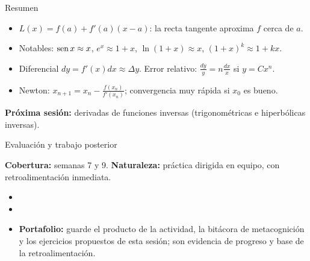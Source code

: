 \documentclass[10pt,aspectratio=169]{beamer}
\begin{document}
\begin{frame}{Resumen}
  \begin{itemize}
    \item $L(x)=f(a)+f'(a)(x-a)$: la recta tangente aproxima $f$ cerca de $a$.
    \item Notables: $\operatorname{sen} x\approx x$, $e^x\approx1+x$, $\ln(1+x)\approx x$, $(1+x)^k\approx1+kx$.
    \item Diferencial $dy=f'(x)dx\approx\Delta y$. Error relativo: $\frac{dy}{y}=n\frac{dx}{x}$ si $y=Cx^n$.
    \item Newton: $x_{n+1}=x_n-\frac{f(x_n)}{f'(x_n)}$; convergencia muy rápida si $x_0$ es bueno.
  \end{itemize}
  \vspace{3mm}
  \textbf{Próxima sesión:} derivadas de funciones inversas (trigonométricas e hiperbólicas inversas).
\end{frame}


\begin{frame}{Evaluación y trabajo posterior}
  \small
  \begin{evalbox}
    \textbf{Cobertura:} semanas 7 y 9. \textbf{Naturaleza:} práctica dirigida en equipo, con retroalimentación inmediata.
  \end{evalbox}
  \begin{itemize}
    \item \criterios
    \item \declaracionia
    \item \textbf{Portafolio:} guarde el producto de la actividad, la bitácora de metacognición y los ejercicios propuestos de esta sesión; son evidencia de progreso y base de la retroalimentación.
  \end{itemize}
\end{frame}
\end{document}
